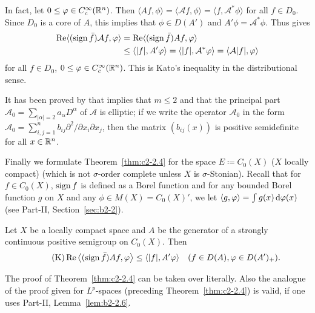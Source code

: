 In fact, let $0 \leq \phi \in C_{c}^{\infty}(\R^n)$.
Then $\langle Af,\phi \rangle = \langle \mathcal{A}f,\phi \rangle = \langle f,\mathcal{A}^{*}\phi \rangle$ for all $f \in D_{0}$.
Since $D_{0}$ is a core of\/ $A$, this implies that $\phi \in D(A')$ and $A'\phi = \mathcal{A}^{*}\phi$.
Thus   gives 
%
\begin{align*}
\Re\langle(\sign \bar{f})\mathcal{A}f,\phi \rangle &= \Re\langle(\sign \bar{f})Af,\phi \rangle \\
 &\leq \langle |f|,A'\phi \rangle = \langle |f|,\mathcal{A}^{*}\phi \rangle = \langle \mathcal{A}|f|,\phi \rangle
\end{align*}
%
for all $f \in D_{0}$, $0 \leq \phi \in C_{c}^{\infty}(\R^n)$.
This is Kato's inequality in the distributional sense.
\begin{remark*}\label{rem:c2-3.0}
It has been proved by \textcite{miyajimaokazawa:1984} that  implies that $m \leq 2$ and that the principal part $\mathcal{A}_{0} = \sum_{|\alpha|=2} a_{\alpha} D^{\alpha}$ of\/ $\mathcal{A}$ is elliptic; \ie if we write the operator $\mathcal{A}_{0}$ in the form $\mathcal{A}_{0} = \sum_{i,j=1}^{n} b_{ij} \partial^{2}/\partial x_{i} \partial x_{j}$, then the matrix $(b_{ij}(x))$ is positive semidefinite for all $x \in \mathbb{R}^n$.
\end{remark*}
Finally we formulate Theorem~\ref{thm:c2-2.4}   for the space $E \coloneq C_{0}(X)$ ($X$ locally compact) (which is not $\sigma$-order complete unless $X$ is $\sigma$-Stonian).
Recall that for $f \in C_{0}(X)$, \mbox{$\operatorname{sign} f$} is defined as a Borel function and for any bounded Borel function $g$ on $X$ and any $\phi \in M(X) = C_{0}(X)'$, we let $\langle g,\phi \rangle = \int g(x) \diff{\phi}(x)$ (see Part-II, Section~\ref{sec:b2-2}).
\begin{theorem}\label{thm:c2-2.6}
%
Let $X$ be a locally compact space and $A$ be the generator of a strongly continuous positive semigroup on 
$C_{0}(X)$.
Then
\begin{equation*}\label{eq:c2-K-3} \tag{K}
\Re\left\langle(\sign \bar{f})Af,\phi \right\rangle \leq \langle |f|,A'\phi \rangle \quad (f \in D(A), \phi \in D(A')_{+}).
\end{equation*}
\end{theorem}
The proof of Theorem~\ref{thm:c2-2.4} can be taken over literally.
Also the analogue of the proof given for $L^p$-spaces (preceding Theorem~\ref{thm:c2-2.4})  is valid, if one uses Part-II, Lemma~\ref{lem:b2-2.6}.
